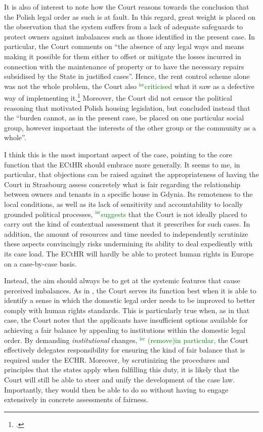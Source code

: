 \documentclass[12pt,a4paper]{book} %
\newcommand{\isr}[1]{\textcolor{green}{$^{\textrm{isr}}${#1}}}
\begin{document}
It is also of interest to note how the Court reasons towards the conclusion that the Polish legal order as such is at fault. In this regard, great weight is placed on the observation that the system suffers from a lack of adequate safeguards to protect owners against imbalances such as those identified in the present case. In particular, the Court comments on ``the absence of any legal ways and means making it possible for them either to offset or mitigate the losses incurred in connection with the maintenance of property or to have the necessary repairs subsidised by the State in justified cases''. Hence, the rent control scheme alone was not the whole problem, the Court also \isr{criticised} what it saw as a defective way of implementing it.\footcite[224]{hutten06} Moreover, the Court did not censor the political reasoning that motivated Polish housing legislation, but concluded instead that the ``burden cannot, as in the present case, be placed on one particular social group, however important the interests of the other group or the community as a whole''. 

I think this is the most important aspect of the case, pointing to the core function that the ECtHR should embrace more generally. It seems to me, in particular, that objections can be raised against the appropriateness of having the Court in Strasbourg assess concretely what is fair regarding the relationship between owners and tenants in a specific house in Gdynia. Its remoteness to the local conditions, as well as its lack of sensitivity and accountability to locally grounded political processes, \isr{suggests} that the Court is not ideally placed to carry out the kind of contextual assessment that it prescribes for such cases. In addition, the amount of resources and time needed to independently scrutinize these aspects convincingly risks undermining its ability to deal expediently with its case load. The ECtHR will hardly be able to protect human rights in Europe on a case-by-case basis.

Instead, the aim should always be to get at the systemic features that cause perceived imbalances. As in \textcite{hutten06}, the Court serves its function best when it is able to identify a sense in which the domestic legal order needs to be improved to better comply with human rights standards. This is particularly true when, as in that case, the Court notes that the applicants have insufficient options available for achieving a fair balance by appealing to institutions within the domestic legal order. By demanding {\it institutional} changes, \isr{ (remove)in particular,} the Court effectively delegates responsibility for ensuring the kind of fair balance that is required under the ECHR. Moreover, by scrutinizing the procedures and principles that the states apply when fulfilling this duty, it is likely that the Court will still be able to steer and unify the development of the case law. Importantly, they would then be able to do so without having to engage extensively in concrete assessments of fairness. 
\end{document}
